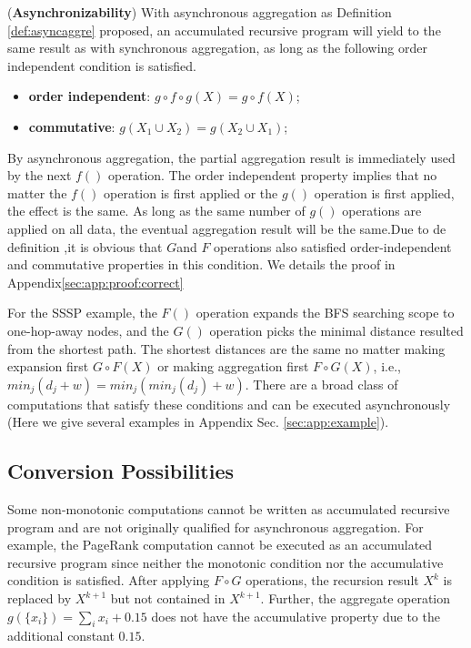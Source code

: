 \begin{theorem}
	\label{th:async}
	(\textbf{Asynchronizability}) With asynchronous aggregation as Definition \ref{def:asyncaggre} proposed, an accumulated recursive program will yield to the same result as with synchronous aggregation, as long as the following order independent condition is satisfied.
	\begin{itemize}
		\item \textbf{order independent}: $g\circ f\circ g(X)=g\circ f(X)$;
		\item \textbf{commutative}: $g(X_1\cup X_2)=g(X_2\cup X_1)$;
	\end{itemize}
\end{theorem}
By asynchronous aggregation, the partial aggregation result is immediately used by the next $f()$ operation. The order independent property implies that no matter the $f()$ operation is first applied or the $g()$ operation is first applied, the effect is the same. As long as the same number of $g()$ operations are applied on all data, the eventual aggregation result will be the same.Due to de definition ,it is obvious that $G$and $F$ operations also satisfied order-independent and commutative properties in this condition. We details the proof in Appendix\ref{sec:app:proof:correct}


For the SSSP example, the $F()$ operation expands the BFS searching scope to one-hop-away nodes, and the $G()$ operation picks the minimal distance resulted from the shortest path. The shortest distances are the same no matter making expansion first $G\circ F(X)$ or making aggregation first $F\circ G(X)$, i.e., $min_j(d_j+w)=min_j(min_j(d_j)+w)$. There are a broad class of computations that satisfy these conditions and can be executed asynchronously (Here we give several examples in Appendix Sec. \ref{sec:app:example}).


\subsection{Conversion Possibilities}
\label{sec:async:convert}

Some non-monotonic computations cannot be written as accumulated recursive program and are not originally qualified for asynchronous aggregation. For example, the PageRank computation cannot be executed as an accumulated recursive program since neither the monotonic condition nor the accumulative condition is satisfied. After applying $F\circ G$ operations, the recursion result $X^{k}$ is replaced by $X^{k+1}$ but not contained in $X^{k+1}$. Further, the aggregate operation $g(\{x_i\})=\sum_i{x_i}+0.15$ does not have the accumulative property due to the additional constant $0.15$.

